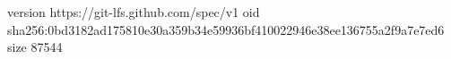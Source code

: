 version https://git-lfs.github.com/spec/v1
oid sha256:0bd3182ad175810e30a359b34e59936bf410022946e38ee136755a2f9a7e7ed6
size 87544
